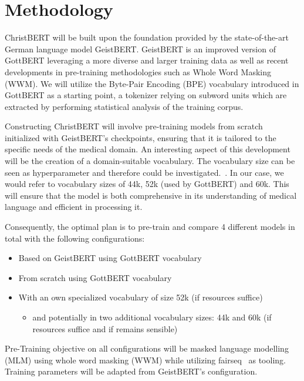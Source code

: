 \chapter*{Methodology}\label{chapter:methodology}

ChristBERT will be built upon the foundation provided by the state-of-the-art
German language model GeistBERT. GeistBERT is an improved version of GottBERT
leveraging a more diverse and larger training data as well as recent
developments in pre-training methodologies such as Whole Word Masking (WWM). We
will utilize the Byte-Pair Encoding (BPE) vocabulary introduced in GottBERT as a
starting point, a tokenizer relying on subword units which are extracted by
performing statistical analysis of the training corpus.

Constructing ChristBERT will involve pre-training models from scratch
initialized with GeistBERT's checkpoints, ensuring that it is tailored to the
specific needs of the medical domain. An interesting aspect of this development
will be the creation of a domain-suitable vocabulary. The vocabulary size can be
seen as hyperparameter and therefore could be
investigated.~\cite{toraman2023impact}. In our case, we would refer to
vocabulary sizes of 44k, 52k (used by GottBERT) and 60k. This will ensure that
the model is both comprehensive in its understanding of medical language and
efficient in processing it.

Consequently, the optimal plan is to pre-train and compare 4 different models in
total with the following configurations:

\begin{itemize}
    \item Based on GeistBERT using GottBERT vocabulary
    \item From scratch using GottBERT vocabulary
    \item With an own specialized vocabulary of size 52k (if resources suffice)
    \begin{itemize}
        \item and potentially in two additional vocabulary sizes: 44k and 60k
        (if resources suffice and if remains sensible)
    \end{itemize}
\end{itemize}

Pre-Training objective on all configurations will be masked language modelling
(MLM) using whole word masking (WWM) while utilizing
fairseq~\cite{ott2019fairseq} as tooling. Training parameters will be adapted
from GeistBERT's configuration.

